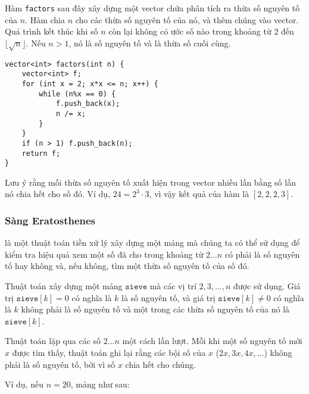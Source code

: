 \noindent
Hàm \texttt{factors} sau đây
xây dựng một vector chứa phân tích ra thừa số
nguyên tố của $n$.
Hàm chia $n$ cho các thừa số nguyên tố của nó,
và thêm chúng vào vector.
Quá trình kết thúc khi số $n$ còn lại
không có ước số nào trong khoảng từ $2$ đến $\lfloor \sqrt n \rfloor$.
Nếu $n>1$, nó là số nguyên tố và là thừa số cuối cùng.

\begin{lstlisting}
vector<int> factors(int n) {
    vector<int> f;
    for (int x = 2; x*x <= n; x++) {
        while (n%x == 0) {
            f.push_back(x);
            n /= x;
        }
    }
    if (n > 1) f.push_back(n);
    return f;
}
\end{lstlisting}

Lưu ý rằng mỗi thừa số nguyên tố xuất hiện trong vector
nhiều lần bằng số lần nó chia hết cho số đó.
Ví dụ, $24=2^3 \cdot 3$,
vì vậy kết quả của hàm là $[2,2,2,3]$.

\subsubsection{Sàng Eratosthenes}


là một thuật toán tiền xử lý
xây dựng một mảng mà chúng ta có thể
sử dụng để kiểm tra hiệu quả xem một số đã cho trong khoảng từ $2 \ldots n$
có phải là số nguyên tố hay không và, nếu không, tìm một thừa số nguyên tố của số đó.

Thuật toán xây dựng một mảng $\texttt{sieve}$
mà các vị trí $2,3,\ldots,n$ được sử dụng.
Giá trị $\texttt{sieve}[k]=0$ có nghĩa là
$k$ là số nguyên tố,
và giá trị $\texttt{sieve}[k] \neq 0$
có nghĩa là $k$ không phải là số nguyên tố và một
trong các thừa số nguyên tố của nó là $\texttt{sieve}[k]$.

Thuật toán lặp qua các số
$2 \ldots n$ một cách lần lượt.
Mỗi khi một số nguyên tố mới $x$ được tìm thấy,
thuật toán ghi lại rằng các bội số
của $x$ ($2x,3x,4x,\ldots$) không phải là số nguyên tố,
bởi vì số $x$ chia hết cho chúng.

Ví dụ, nếu $n=20$, mảng như sau:

